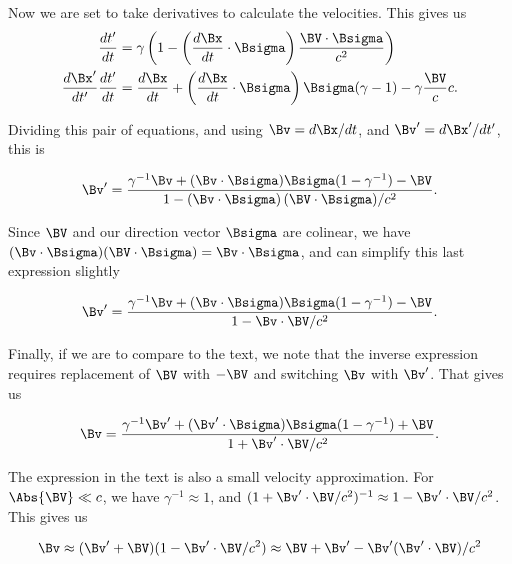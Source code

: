 Now we are set to take derivatives to calculate the velocities.  This gives us
\begin{subequations}
\begin{align}\label{eqn:relativisticElectrodynamicsA1:230}
\frac{dt'}{dt} &= \gamma \left( 1 - \left( \frac{d\Bx}{dt} \cdot \Bsigma \right) \frac{\BV \cdot \Bsigma}{c^2} \right) \\
\frac{d\Bx'}{dt'} \frac{d t'}{dt} &= \frac{d\Bx}{dt} + \left(\frac{d\Bx}{dt} \cdot \Bsigma\right) \Bsigma (\gamma - 1) - \gamma \frac{\BV}{c} c .
\end{align}
\end{subequations}

Dividing this pair of equations, and using $\Bv = d\Bx/dt$, and $\Bv' = d\Bx'/dt'$, this is

\begin{equation}\label{eqn:relativisticElectrodynamicsA1:240}
\Bv' = \frac{\gamma^{-1} \Bv + (\Bv \cdot \Bsigma) \Bsigma (1 - \gamma^{-1}) - \BV}{ 1 - \left( \Bv \cdot \Bsigma \right) (\BV \cdot \Bsigma)/c^2 }.
\end{equation}

Since $\BV$ and our direction vector $\Bsigma$ are colinear, we have $(\Bv \cdot \Bsigma) (\BV \cdot \Bsigma) = \Bv \cdot \Bsigma$, and can simplify this last expression slightly

\begin{equation}\label{eqn:relativisticElectrodynamicsA1:250}
\Bv' = \frac{\gamma^{-1} \Bv + (\Bv \cdot \Bsigma) \Bsigma (1 - \gamma^{-1}) - \BV}{ 1 - \Bv \cdot \BV/c^2 }.
\end{equation}

Finally, if we are to compare to the text, we note that the inverse expression requires replacement of $\BV$ with $-\BV$ and switching $\Bv$ with $\Bv'$.  That gives us

\begin{equation}\label{eqn:relativisticElectrodynamicsA1:250i}
\Bv = \frac{\gamma^{-1} \Bv' + (\Bv' \cdot \Bsigma) \Bsigma (1 - \gamma^{-1}) + \BV}{ 1 + \Bv' \cdot \BV/c^2 }.
\end{equation}

The expression in the text is also a small velocity approximation.  For $\Abs{\BV} \ll c$, we have $\gamma^{-1} \approx 1$, and $(1 + \Bv' \cdot \BV/c^2)^{-1} \approx 1 - \Bv' \cdot \BV/c^2$.  This gives us

\begin{equation}\label{eqn:relativisticElectrodynamicsA1:250a}
\Bv \approx (\Bv' + \BV)( 1 - \Bv' \cdot \BV/c^2 ) \approx \BV + \Bv' - \Bv' (\Bv' \cdot \BV)/c^2
\end{equation}

